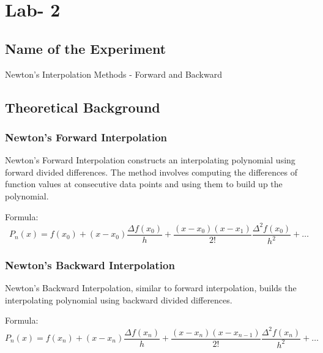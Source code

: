 \documentclass{article}
\begin{document}
\clearpage

\section*{\centering Lab- 2}

\subsection*{Name of the Experiment}
Newton's Interpolation Methods - Forward and Backward

\subsection*{Theoretical Background}

\subsubsection*{Newton's Forward Interpolation}
Newton's Forward Interpolation constructs an interpolating polynomial using forward divided differences. The method involves computing the differences of function values at consecutive data points and using them to build up the polynomial.

Formula:
\[ P_n(x) = f(x_0) + (x - x_0) \frac{\Delta f(x_0)}{h} + \frac{(x - x_0)(x - x_1)}{2!} \frac{\Delta^2 f(x_0)}{h^2} + \ldots \]

\subsubsection*{Newton's Backward Interpolation}
Newton's Backward Interpolation, similar to forward interpolation, builds the interpolating polynomial using backward divided differences.

Formula:
\[ P_n(x) = f(x_n) + (x - x_n) \frac{\Delta f(x_n)}{h} + \frac{(x - x_n)(x - x_{n-1})}{2!} \frac{\Delta^2 f(x_n)}{h^2} + \ldots \]
\end{document}
